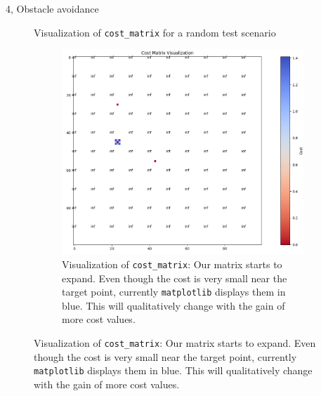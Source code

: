 \documentclass[10pt,a4paper]{article}
\begin{document}
\begin{task}{4, Obstacle avoidance}
\begin{figure}[H]
\begin{center}
 \end{center}

\caption{Visualization of \texttt{cost\_matrix} for a random test scenario}

\end{figure}
 
\begin{figure}[H] \ContinuedFloat


\begin{center}
    

\begin{subfigure}{0.65\textwidth}
 \centering
 \includegraphics[width=1\textwidth]{images/task4_dij_2d_start.png}
 \caption{Visualization of \texttt{cost\_matrix}:
 Our matrix starts to expand. Even though the cost is very small near the target point, currently \texttt{matplotlib} displays them in blue. This will qualitatively change with the gain of more cost values.
 }
 \end{subfigure}


\end{center}
\end{figure}
\end{task}
\end{document}
